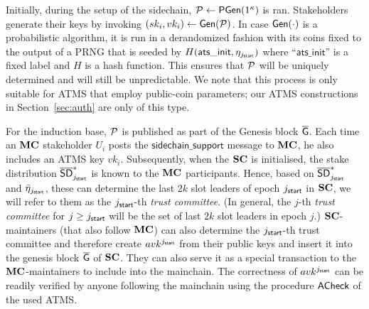 
Initially, during the setup of the sidechain, $\mathcal{P} \gets
\textsf{PGen}(1^\kappa)$ is ran. Stakeholders generate
their keys by invoking $(sk_i, vk_i) \gets \mathsf{Gen}(\mathcal{P})$.
In case $\mathsf{Gen}(\cdot)$ is a probabilistic algorithm, it is run in a derandomized
fashion with its coins fixed to the output of a PRNG that is seeded by
$H(\mathsf{ats\_init}, \eta_{j_{\mathsf{start}}})$ where ``$\mathsf{ats\_init}$'' is a fixed
label and $H$ is a hash function. This ensures that $\mathcal{P}$ will
be uniquely determined and will still be unpredictable. We note
that this process is only suitable for ATMS that employ public-coin parameters;
our ATMS constructions in Section~\ref{sec:auth} are only of this type.

For the induction base, $\mathcal{P}$ is published as part of the Genesis block
$\mathsf{\overline{G}}$.
Each time an $\mathbf{MC}$ stakeholder $U_i$
posts the
$\mathsf{sidechain\_support}$ message to $\mathbf{MC}$, he  also includes an ATMS key $vk_i$.
Subsequently,
when the $\mathbf{SC}$ is initialised, the
stake distribution $\mathsf{\overline{SD}}^*_{j_{\mathsf{start}}}$ is known to the $\mathbf{MC}$ participants. Hence,
based on $\mathsf{\overline{SD}}^*_{j_{\mathsf{start}}}$ and $\bar{\eta}_{j_{\mathsf{start}}}$,
these can determine the last $2k$ slot leaders of epoch $j_{\mathsf{start}}$ in $\mathbf{SC}$,
we will refer to them as the $j_{\mathsf{start}}$-{th} \emph{trust committee}.
(In general, the $j$-th \emph{trust committee} for $j\geq j_{\mathsf{start}}$ will be the set
of last $2k$ slot leaders in epoch $j$.)
$\mathbf{SC}$-maintainers (that also follow $\mathbf{MC}$) can also determine the $j_{\mathsf{start}}$-{th} trust committee
and therefore create $avk^{j_{\mathsf{start}}}$ from their public keys and insert it into
the genesis block $\mathsf{\overline{G}}$ of  $\mathbf{SC}$. They can also serve it as a special
transaction to the $\mathbf{MC}$-maintainers to include into the mainchain.
The correctness of $avk^{j_{\mathsf{start}}}$ can be
readily verified by anyone following the mainchain using the procedure
$\textsf{ACheck}$ of the used ATMS.

